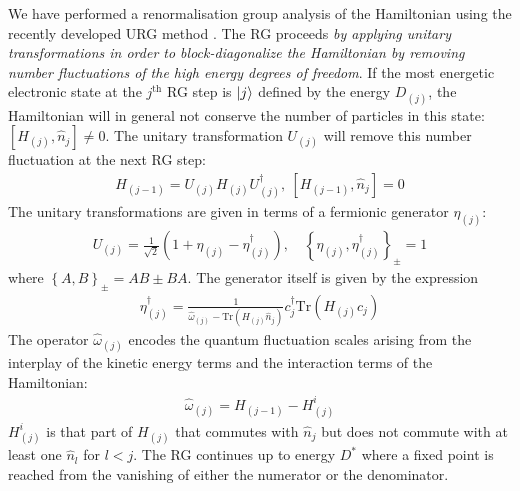 \documentclass[reprint,prb,superscriptaddress]{revtex4-2}
\begin{document}
We have performed a renormalisation group analysis of the Hamiltonian using the recently developed URG method \cite{anirbanmott2,anirbanmott2,anirbanurg1,anirbanurg2,siddharthacpi,santanukagome,1dhubjhep}. The RG proceeds \textit{by applying unitary transformations in order to block-diagonalize the Hamiltonian by removing number fluctuations of the high energy degrees of freedom}. If the most energetic electronic state at the \(j^\text{th}\) RG step is \(\ket{j}\) defined by the energy \(D_{(j)}\), the Hamiltonian will in general not conserve the number of particles in this state: \(\left[H_{(j)}, \hat n_{j}\right] \neq 0\). The unitary transformation \(U_{(j)}\) will remove this number fluctuation at the next RG step:
\begin{equation}\begin{aligned}
	H_{(j-1)} = U_{(j)} H_{(j)} U^\dagger_{(j)}, ~\left[H_{(j-1)}, \hat n_{j}\right] =0
\end{aligned}\end{equation}
The unitary transformations are given in terms of a fermionic generator \(\eta_{(j)}\):
\begin{equation}\begin{aligned}
	U_{(j)} = \frac{1}{\sqrt 2}\left(1 + \eta_{(j)} - \eta_{(j)}^\dagger\right), \quad\left\{ \eta_{(j)},\eta_{(j)}^\dagger \right\}_\pm = 1
\end{aligned}\end{equation}
where \(\left\{A,B\right\}_\pm = AB \pm BA\). The generator itself is given by the expression
\begin{equation}\begin{aligned}
	\eta^\dagger_{(j)} = \frac{1}{\hat \omega_{(j)} - \text{Tr}\left(H_{(j)} \hat n_{j}\right) } c^\dagger_{j} \text{Tr}\left(H_{(j)}c_{j}\right)
\end{aligned}\end{equation}
The operator \(\hat \omega_{(j)}\) encodes the quantum fluctuation scales arising from the interplay of the kinetic energy terms and the interaction terms of the Hamiltonian:
\begin{equation}\begin{aligned}
	\hat \omega_{(j)} = H_{(j-1)} - H^i_{(j)}
\end{aligned}\end{equation}
\(H^i_{(j)}\) is that part of \(H_{(j)}\) that commutes with \(\hat n_j\) but does not commute with at least one \(\hat n_l\) for \(l < j\). The RG continues up to energy \(D^*\) where a fixed point is reached from the vanishing of either the numerator or the denominator.
\end{document}

